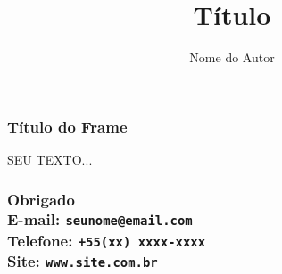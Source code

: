\documentclass{beamer}
\title{Título}
\author{Nome do Autor}
\institute{Formação $|$ Departamento $|$ Centro}
\begin{document}
\maketitle

\begin{frame}
	\frametitle{Título do Frame}
	SEU TEXTO...
\end{frame}



\begin{frame}
\frametitle{
	\textbf{Obrigado} \\ \vskip2pt
	E-mail: \texttt{seunome@email.com} \\ \vskip2pt
	Telefone: \texttt{+55(xx) xxxx-xxxx} \\ \vskip2pt
	Site: \texttt{www.site.com.br} \\
	}
\end{frame}
\end{document}
